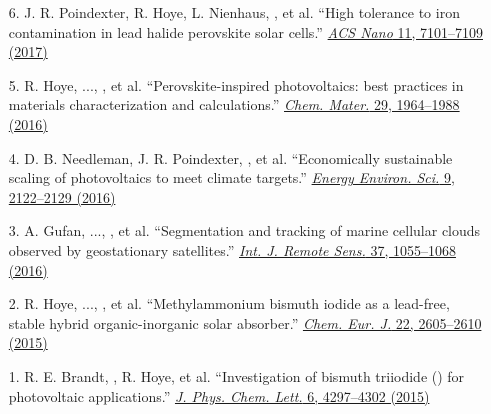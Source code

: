 \begin{enumerate}
        \item[6.] J. R. Poindexter, R. Hoye, L. Nienhaus, \myname, et al. ``High tolerance to iron contamination in lead halide perovskite solar cells.'' \href{https://pubs.acs.org/doi/10.1021/acsnano.7b02734}{\textit{ACS Nano} 11, 7101--7109 (2017)}

        \item[5.] R. Hoye, ..., \myname, et al. ``Perovskite-inspired photovoltaics: best practices in materials characterization and calculations.'' \href{https://pubs.acs.org/doi/10.1021/acs.chemmater.6b03852}{\textit{Chem. Mater.} 29, 1964--1988 (2016)}

        \item[4.] D. B. Needleman, J. R. Poindexter, \myname, et al. ``Economically sustainable scaling of photovoltaics to meet climate targets.'' \href{https://pubs.rsc.org/en/content/articlelanding/2016/EE/C6EE00484A}{\textit{Energy Environ. Sci.} 9, 2122--2129 (2016)}

        \item[3.] A. Gufan, ..., \myname, et al. ``Segmentation and tracking of marine cellular clouds observed by geostationary satellites.'' \href{https://www.tandfonline.com/doi/full/10.1080/2150704X.2016.1142681?cookieSet=1}{\textit{Int. J. Remote Sens.} 37, 1055--1068 (2016)}

        \item[2.] R. Hoye, ..., \myname, et al. ``Methylammonium bismuth iodide as a lead-free, stable hybrid organic-inorganic solar absorber.'' \href{http://doi.wiley.com/10.1002/chem.201505055}{\textit{Chem. Eur. J.} 22, 2605--2610 (2015)}

        \item[1.] R. E. Brandt, \myname, R. Hoye, et al. ``Investigation of bismuth triiodide () for photovoltaic applications.'' \href{https://pubs.acs.org/doi/full/10.1021/acs.jpclett.5b02022}{\textit{J. Phys. Chem. Lett.} 6, 4297--4302 (2015)}
\end{enumerate}


